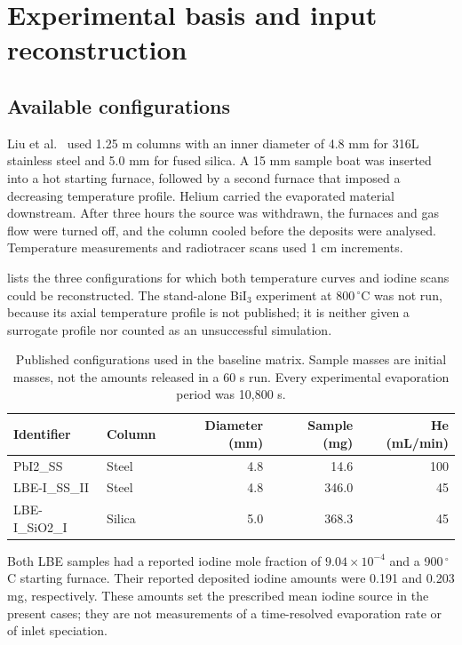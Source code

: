 \section{Experimental basis and input reconstruction}
\label{sec:experiments}
\subsection{Available configurations}
Liu et al.\ \cite{Liu2025chemical} used 1.25 m columns with an inner
diameter of 4.8 mm for 316L stainless steel and 5.0 mm for fused
silica. A 15 mm sample boat was inserted into a hot starting furnace,
followed by a second furnace that imposed a decreasing temperature
profile. Helium carried the evaporated material downstream. After
three hours the source was withdrawn, the furnaces and gas flow were
turned off, and the column cooled before the deposits were analysed.
Temperature measurements and radiotracer scans used 1 cm increments.

 lists the three configurations for which both
temperature curves and iodine scans could be reconstructed. The
stand-alone BiI$_3$ experiment at 800\,$^\circ$C was not run, because
its axial temperature profile is not published; it is neither given a
surrogate profile nor counted as an unsuccessful simulation.
\begin{table}[tb]
\centering
\caption{Published configurations used in the baseline matrix. Sample
masses are initial masses, not the amounts released in a 60 s run.
Every experimental evaporation period was 10,800 s.}
\label{tab:experiments}
\begin{tabular}{llrrr}
\toprule
Identifier & Column & Diameter (mm) & Sample (mg) & He (mL/min) \\
\midrule
PbI2\_SS & Steel & 4.8 & 14.6 & 100 \\
LBE-I\_SS\_II & Steel & 4.8 & 346.0 & 45 \\
LBE-I\_SiO2\_I & Silica & 5.0 & 368.3 & 45 \\
\bottomrule
\end{tabular}
\end{table}

Both LBE samples had a reported iodine mole fraction of
$9.04\times10^{-4}$ and a 900\,$^\circ$C starting furnace. Their
reported deposited iodine amounts were 0.191 and 0.203 mg,
respectively. These amounts set the prescribed mean iodine source in
the present cases; they are not measurements of a time-resolved
evaporation rate or of inlet speciation.


